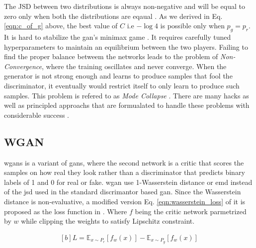 The \ac{JSD} between two distributions is always non-negative and will be equal to zero only when both the distributions are eqaual \cite{js_divergence}. As we derived in Eq. \ref{eqn:c_of_g} above, the best value of $C$ i.e $-\log 4$ is possible only when $p_{g}=p_{r}$. It is hard to stabilize the \ac{gan}'s minimax game \cite{martin2017principled}. It requires carefully tuned hyperparameters to maintain an equilibrium between the two players. Failing to find the proper balance betweem the networks leads to the problem of \textit{Non-Convergence}, where the training oscillates and never converge. When the generator is not strong enough and learns to produce samples that fool the discriminator, it eventually would restrict itself to only learn to produce such samples. This problem is refered to as \textit{Mode Collapse} \cite{commonganprobs}. There are many hacks as well as principled approachs that are formualated to handle these problems with considerable success \cite{openaigan2wgan}.

\subsection{WGAN}
\acp{wgan} is a variant of \acp{gan}, where the second network is a critic that scores the samples on how real they look rather than a discriminator that predicts binary labels of 1 and 0 for real or fake. \ac{wgan} use 1-Wasserstein distance \cite{wasserstein_metric_2020} or \ac{emd} instead of the \ac{jsd} used in the standard discrimantor based \ac{gan}. Since the Wasserstein distance is non-evaluative, a modified version Eq. \ref{eqn:wasserstein_loss} of it is proposed as the loss function in \cite{soumith2017wasserstein}. Where $f$ being the critic network parmetrized by $w$ while clipping the weights to satisfy Lipschitz constraint.

\begin{equation} \label{eqn:wasserstein_loss}
    \begin{aligned}[b]
        L=\mathbb{E}_{x \sim P_{r}}\left[f_{w}(x)\right]-\mathbb{E}_{x \sim P_{g}}\left[f_{w}(x)\right]
    \end{aligned}
\end{equation}




